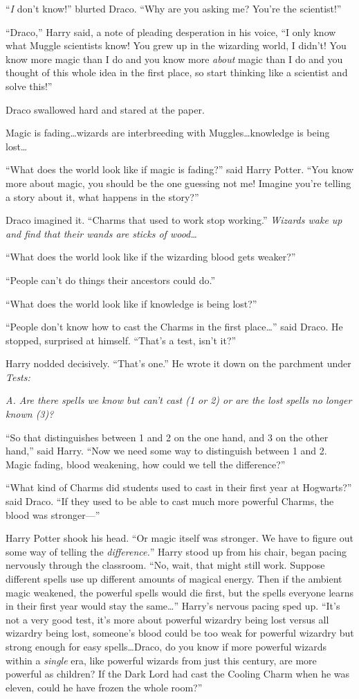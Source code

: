 “\emph{I} don’t know!” blurted Draco. “Why are you asking me? You’re the scientist!”

“Draco,” Harry said, a note of pleading desperation in his voice, “I only know what Muggle scientists know! You grew up in the wizarding world, I didn’t! You know more magic than I do and you know more \emph{about} magic than I do and you thought of this whole idea in the first place, so start thinking like a scientist and solve this!”

Draco swallowed hard and stared at the paper.

Magic is fading…wizards are interbreeding with Muggles…knowledge is being lost…

“What does the world look like if magic is fading?” said Harry Potter. “You know more about magic, you should be the one guessing not me! Imagine you’re telling a story about it, what happens in the story?”

Draco imagined it. “Charms that used to work stop working.” \emph{Wizards wake up and find that their wands are sticks of wood…}

“What does the world look like if the wizarding blood gets weaker?”

“People can’t do things their ancestors could do.”

“What does the world look like if knowledge is being lost?”

“People don’t know how to cast the Charms in the first place…” said Draco. He stopped, surprised at himself. “That’s a test, isn’t it?”

Harry nodded decisively. “That’s one.” He wrote it down on the parchment under \emph{Tests:}

\emph{A. Are there spells we know but can’t cast (1 or 2) or are the lost spells no longer known (3)?}

“So that distinguishes between 1 and 2 on the one hand, and 3 on the other hand,” said Harry. “Now we need some way to distinguish between 1 and 2. Magic fading, blood weakening, how could we tell the difference?”

“What kind of Charms did students used to cast in their first year at Hogwarts?” said Draco. “If they used to be able to cast much more powerful Charms, the blood was stronger—”

Harry Potter shook his head. “Or magic itself was stronger. We have to figure out some way of telling the \emph{difference.}” Harry stood up from his chair, began pacing nervously through the classroom. “No, wait, that might still work. Suppose different spells use up different amounts of magical energy. Then if the ambient magic weakened, the powerful spells would die first, but the spells everyone learns in their first year would stay the same…” Harry’s nervous pacing sped up. “It’s not a very good test, it’s more about powerful wizardry being lost versus all wizardry being lost, someone’s blood could be too weak for powerful wizardry but strong enough for easy spells…Draco, do you know if more powerful wizards within a \emph{single} era, like powerful wizards from just this century, are more powerful as children? If the Dark Lord had cast the Cooling Charm when he was eleven, could he have frozen the whole room?”

